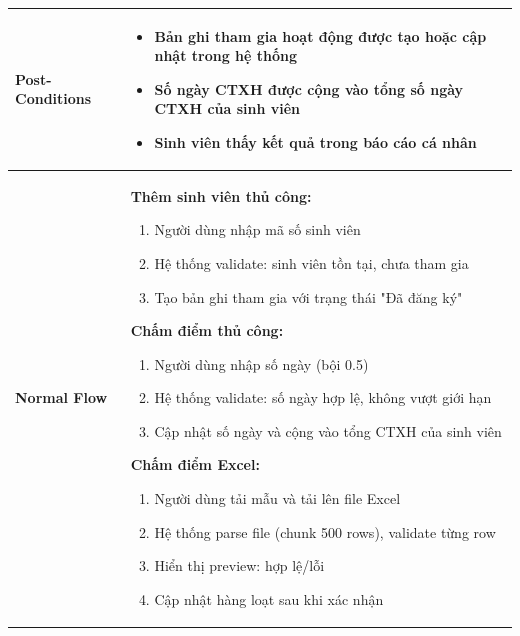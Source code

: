\begin{table}[H]
\begin{tabular}{|m{}|m{}|}
    \textbf{Post-Conditions} 
    & \begin{itemize}
        \item Bản ghi tham gia hoạt động được tạo hoặc cập nhật trong hệ thống
        \item Số ngày CTXH được cộng vào tổng số ngày CTXH của sinh viên
        \item Sinh viên thấy kết quả trong báo cáo cá nhân
    \end{itemize}
    \\ \hline

    \textbf{Normal Flow} 
    & \textbf{Thêm sinh viên thủ công:}
    \begin{enumerate}
        \item Người dùng nhập mã số sinh viên
        \item Hệ thống validate: sinh viên tồn tại, chưa tham gia
        \item Tạo bản ghi tham gia với trạng thái "Đã đăng ký"
    \end{enumerate}

    \textbf{Chấm điểm thủ công:}
    \begin{enumerate}
        \item Người dùng nhập số ngày (bội 0.5)
        \item Hệ thống validate: số ngày hợp lệ, không vượt giới hạn
        \item Cập nhật số ngày và cộng vào tổng CTXH của sinh viên
    \end{enumerate}

    \textbf{Chấm điểm Excel:}
    \begin{enumerate}
        \item Người dùng tải mẫu và tải lên file Excel
        \item Hệ thống parse file (chunk 500 rows), validate từng row
        \item Hiển thị preview: hợp lệ/lỗi
        \item Cập nhật hàng loạt sau khi xác nhận
    \end{enumerate}
    \\ \hline
    \end{tabular}
    \end{table}

